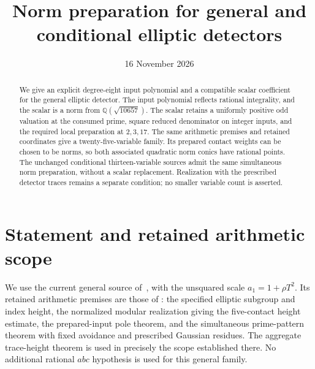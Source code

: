 \documentclass[11pt,a4paper]{article}
\title{Norm preparation for general and conditional elliptic detectors}
\author{}\date{16 November 2026}
\newcommand{\Q}{\mathbb Q}\newcommand{\Z}{\mathbb Z}
\begin{document}
\maketitle
\begin{abstract}
We give an explicit degree-eight input polynomial and a compatible scalar
coefficient for the general elliptic detector. The input polynomial
reflects rational integrality, and the scalar is a norm from
$\Q(\sqrt{10657})$.
The scalar retains a uniformly positive odd valuation at the consumed
prime, square reduced denominator on integer inputs, and the required
local preparation at $2,3,17$. The same arithmetic premises and retained
coordinates give a twenty-five-variable family. Its prepared contact
weights can be chosen to be norms, so both associated quadratic norm
conics have rational points. The unchanged conditional thirteen-variable
sources admit the same simultaneous norm preparation, without a scalar
replacement. Realization with the prescribed detector traces remains a
separate condition; no smaller variable count is asserted.
\end{abstract}

\section{Statement and retained arithmetic scope}
We use the current general source of~\cite{UnitNorm}, with the unsquared
scale $a_1=1+\rho T^2$. Its retained arithmetic premises are those of
\cite{General,Dependencies}: the specified elliptic subgroup and index
height, the normalized modular realization giving the five-contact
height estimate, the prepared-input pole theorem, and the simultaneous
prime-pattern theorem with fixed avoidance and prescribed Gaussian
residues. The aggregate trace-height theorem is used in precisely the
scope established there. No additional rational $abc$ hypothesis is used
for this general family.
\end{document}
